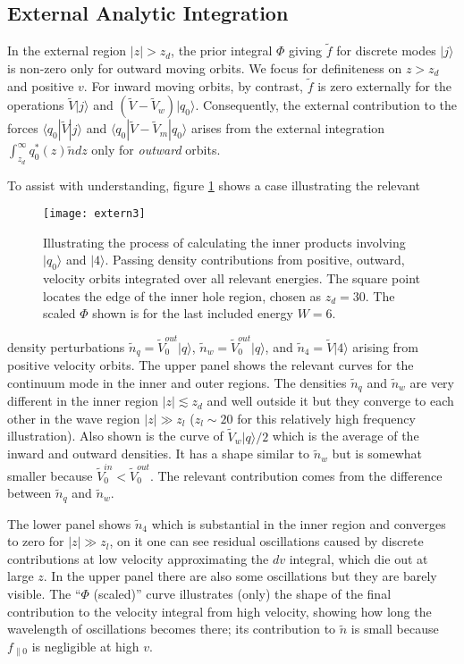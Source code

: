 \documentclass[12pt]{article}
\def\ket#1{|#1\rangle}
\def\bra#1{\langle#1}
\begin{document}
\subsection{External Analytic Integration}

In the external region $|z|>z_d$, the prior integral $\Phi$ giving
$\tilde f$ for discrete modes $\ket{j}$ is non-zero only for outward
moving orbits. We focus for definiteness on $z>z_d$ and positive $v$.
For inward moving orbits, by contrast, $\tilde f$ is zero externally
for the operations $\tilde V\ket{j}$ and
$(\tilde V -\tilde V_w)\ket{q_0}$. Consequently, the external
contribution to the forces $\bra{q_0}|\tilde V \ket{j}$ and
$\bra{q_0}|\tilde V -\tilde V_m\ket{q_0}$ arises from the external
integration $\int_{z_d}^\infty q_0^*(z) \tilde n dz$ only for \emph{outward} orbits.

To assist with understanding, figure \ref{externfig2} shows a case
illustrating the relevant
\begin{figure}[ht]
  \texttt{[image: extern3]}
  \caption{Illustrating the process of calculating the inner products
    involving $\ket{q_0}$ and $\ket{4}$. Passing density contributions
    from positive, outward, velocity orbits integrated over all
    relevant energies. The square point locates the edge of the inner
    hole region, chosen as $z_d=30$. The scaled $\Phi$ shown is for the
    last included energy $W=6$.\label{externfig2}}
\end{figure}
density perturbations $\tilde n_q=\tilde V_0^{out}\ket{q}$,
$\tilde n_w=\tilde V_0^{out}\ket{q}$, and $\tilde n_4=\tilde V\ket{4}$
arising from positive velocity orbits. The upper panel shows the
relevant curves for the continuum mode in the inner and outer regions.
The densities $\tilde n_q$ and $\tilde n_w$ are very different in the
inner region $|z|\lesssim z_d$ and well outside it but they converge to each
other in the wave region $|z|\gg z_l$ ($z_l\sim 20$ for this
relatively high frequency illustration). Also shown is the curve of
$\tilde V_w\ket{q}/2$ which is the average of the inward and
outward densities. It has a shape similar to $\tilde n_w$ but is
somewhat smaller because $\tilde V_0^{in}< \tilde V_0^{out}$. The
relevant contribution comes from the difference between $\tilde n_q$
and $\tilde n_w$. 

The lower panel shows $\tilde n_4$ which is substantial in the inner
region and converges to zero for $|z|\gg z_l$, on it one can see
residual oscillations caused by discrete contributions at low velocity
approximating the $dv$ integral, which die out at large $z$. In the
upper panel there are also some oscillations but they are barely
visible. The ``$\Phi$ (scaled)'' curve illustrates (only) the shape of
the final contribution to the velocity integral from high velocity,
showing how long the wavelength of oscillations becomes there; its
contribution to $\tilde n$ is small because $f_{\parallel0}$ is
negligible at high $v$.
\end{document}
